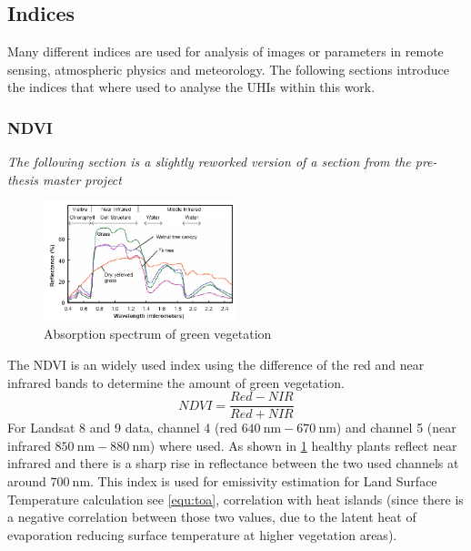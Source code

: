 \subsection{Indices}
Many different indices are used for analysis of images or parameters in remote sensing, atmospheric physics and meteorology.
The following sections introduce the indices that where used to analyse the \glspl{UHI} within this work. 
\subsubsection{NDVI}
\textit{The following section is a slightly reworked version of a section from the pre-thesis master project~\cite{andrae2023}}\\ 
%
\noindent
\begin{figure}[!htbp]
    \centering
    \includegraphics[width=0.5\textwidth]{img/Reflectance-spectra-of-different-types-of-green-vegetation-compared-to-a-spectral.png}
    \caption{Absorption spectrum of green vegetation\cite[P. 5]{Smith2012}\label{fig:absorbtionVeg}}
\end{figure}
The \gls{NDVI} is an widely used index using the difference of the red and near infrared bands to determine the amount of green vegetation. 
\begin{equation}
    NDVI = \frac{Red-NIR}{Red+NIR}
    \label{equ:ndvi}
\end{equation}
For Landsat 8 and 9 data, channel 4 (red $640\ \text{nm} - 670\ \text{nm}$) and channel 5 (near infrared $850\ \text{nm} - 880\ \text{nm}$) where used.
As shown in \cref{fig:absorbtionVeg} healthy plants reflect near infrared and there is a sharp rise in reflectance between the two used channels at around $700\ \text{nm}$. 
%
This index is used for emissivity estimation for Land Surface Temperature calculation see \cref{equ:toa}, correlation with heat islands (since there is a negative correlation between those two values, due to the latent heat of evaporation reducing surface temperature at higher vegetation areas).
